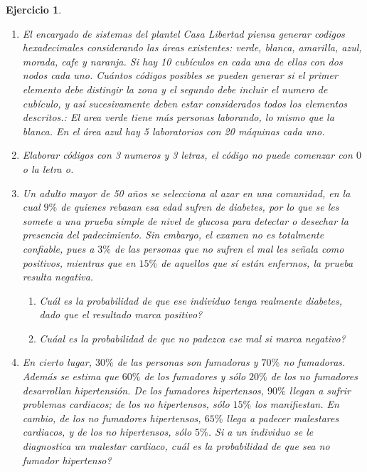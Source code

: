 \documentclass[12pt,twoside]{article}
\newtheorem{Ejer}{Ejercicio}
\begin{document}
\begin{Ejer}
\begin{enumerate}
\item El encargado de sistemas del plantel Casa Libertad piensa generar codigos hexadecimales considerando las \'areas existentes: verde, blanca, amarilla, azul, morada, cafe y naranja. Si hay 10 cub\'iculos en cada una de ellas con dos nodos cada uno. Cu\'antos c\'odigos posibles se pueden generar si el primer elemento debe distingir la zona y el segundo debe incluir el numero de cub\'iculo, y as\'i sucesivamente deben estar considerados todos los elementos descritos.: El area verde tiene m\'as personas laborando, lo mismo que la blanca.  En el \'area azul hay 5 laboratorios con 20 m\'aquinas cada uno.


\item Elaborar c\'odigos con 3 numeros y 3 letras, el c\'odigo no puede comenzar con $0$ o la letra \textit{o}.



\item Un adulto mayor de 50 a\~nos se selecciona al azar en una comunidad, en la cual $9\%$ de quienes rebasan esa edad sufren de diabetes, por lo que se les somete a una prueba simple de nivel de glucosa para detectar o desechar la presencia del padecimiento. Sin embargo, el examen no es totalmente confiable, pues a $3\%$ de las personas que no sufren el mal les se\~nala como positivos, mientras que en $15\%$ de aquellos que s\'i est\'an enfermos, la prueba resulta negativa.

\begin{enumerate}
\item Cu\'al es la probabilidad de que ese individuo tenga realmente diabetes, dado que el resultado marca positivo?
\item Cu\'aal es la probabilidad de que no padezca ese mal si marca negativo?
\end{enumerate}

\item En cierto lugar, $30\%$ de las personas son fumadoras y $70\%$ no fumadoras. Adem\'as se estima que $60\%$ de los fumadores y s\'olo $20\%$ de los no fumadores desarrollan hipertensi\'on. De los fumadores hipertensos, $90\%$ llegan a sufrir problemas cardiacos; de los no hipertensos, s\'olo $15\%$ los manifiestan. En cambio, de los no fumadores hipertensos, $65\%$ llega a padecer malestares cardiacos, y de los no hipertensos, s\'olo $5\%$. Si a un individuo se le diagnostica un malestar cardiaco,  cu\'al es la probabilidad de que sea no fumador hipertenso?

\end{enumerate}
\end{Ejer}
\end{document}
